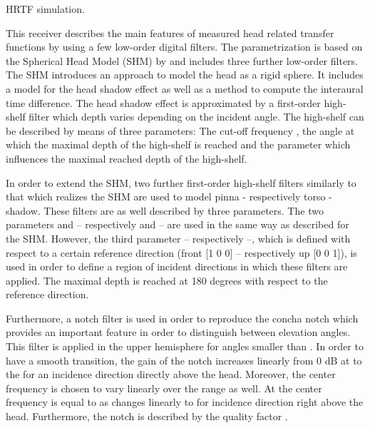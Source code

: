 HRTF simulation.

This receiver describes the main features of measured head related transfer
functions by using a few low-order digital filters. The parametrization is
based on the Spherical Head Model (SHM) by \citet{BrownDuda}
and includes three further low-order filters. The SHM introduces an approach
to model the head as a rigid sphere. It includes a model for the head shadow
effect as well as a method to compute the interaural time difference.
The head shadow effect is approximated by a first-order high-shelf filter
which depth varies depending on the incident angle. The high-shelf can be
described by means of three parameters: The cut-off frequency ,
the angle  at which the maximal depth of the high-shelf is
reached and the parameter  which influences the maximal
reached depth of the high-shelf.

In order to extend the SHM, two further first-order high-shelf filters
similarly to that which realizes the SHM are used to model pinna
- respectively torso - shadow. These filters are as well described by
three parameters. The two parameters  and
 -- respectively  and
 -- are used in the same way as described for the SHM.
However, the third parameter  -- respectively
 --, which is defined with respect to a certain
reference direction (front [1 0 0] -- respectively up [0 0 1]), is used
in order to define a region of incident directions in which these filters
are applied. The maximal depth is reached at 180 degrees with respect to
the reference direction.

Furthermore, a notch filter is used in order to reproduce the concha notch
which provides an important feature in order to distinguish between elevation
angles. This filter is applied in the upper hemisphere for angles smaller
than . In order to have a smooth transition, the
gain of the notch increases linearly from 0 dB at 
to the  for an incidence direction directly above the head.
Moreover, the center frequency is chosen to vary linearly over the range
as well. At  the center frequency is equal to
 as changes linearly to  for incidence
direction right above the head. Furthermore, the notch is described by the
quality factor .


